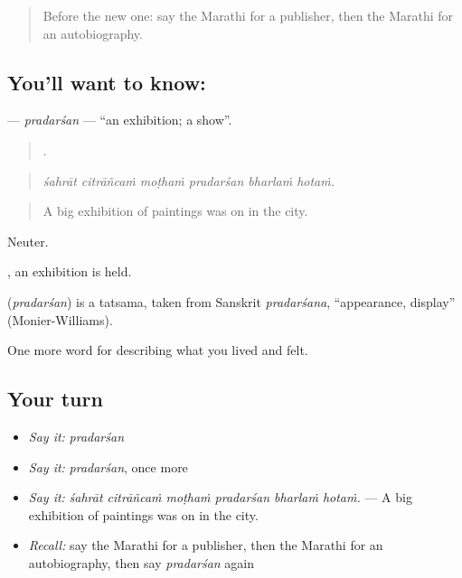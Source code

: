 \label{lesson:MR-C539-pradarsan}



\begin{quote}
Before the new one: say the Marathi for a publisher, then the Marathi for an autobiography.
\end{quote}

\subsection*{You'll want to know: }
\textbf{} — \emph{pradarśan} — \textquotedblleft{}an exhibition; a show\textquotedblright{}.

\begin{quote}
     .
\end{quote}

\begin{quote}
\emph{śahrāt citrāñcaṁ moṭhaṁ pradarśan bharlaṁ hotaṁ.}
\end{quote}

\begin{quote}
A big exhibition of paintings was on in the city.
\end{quote}

Neuter.

 , an exhibition is held.

\begin{cousinweb}
\textbf{} (\emph{pradarśan}) is a tatsama, taken from Sanskrit \emph{pradarśana}, \textquotedblleft{}appearance, display\textquotedblright{} (Monier-Williams).
\end{cousinweb}

\begin{grammarlens}[title={What you've built}]
One more word for describing what you lived and felt.
\end{grammarlens}

\subsection*{Your turn}
\begin{itemize}
\raggedright
  \item \emph{Say it:} \emph{pradarśan}
  \item \emph{Say it:} \emph{pradarśan}, once more
  \item \emph{Say it:} \emph{śahrāt citrāñcaṁ moṭhaṁ pradarśan bharlaṁ hotaṁ.} — A big exhibition of paintings was on in the city.
  \item \emph{Recall:} say the Marathi for a publisher, then the Marathi for an autobiography, then say \emph{pradarśan} again
\end{itemize}

